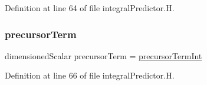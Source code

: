 Definition at line 64 of file integral\+Predictor.\+H.

\mbox{\label{integralPredictor_8H_a036c76c07f219017fb5141b4e0bdc0d7}} 
\subsubsection{\texorpdfstring{precursor\+Term}{precursorTerm}}
{\footnotesize\ttfamily dimensioned\+Scalar precursor\+Term = \hyperlink{integralPredictorSP3_8H_a6f122f03262179afd60cc84232ee4bf9}{precursor\+Term\+Int}}



Definition at line 66 of file integral\+Predictor.\+H.

